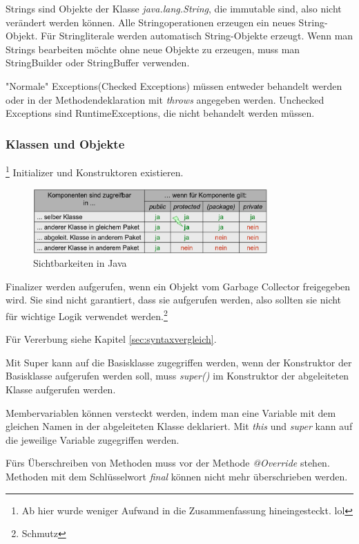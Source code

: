 \documentclass[12pt]{scrartcl}
\begin{document}
Strings sind Objekte der Klasse \emph{java.lang.String}, die immutable sind, also nicht verändert werden können.
Alle Stringoperationen erzeugen ein neues String-Objekt. Für Stringliterale werden automatisch
String-Objekte erzeugt.
Wenn man Strings bearbeiten möchte ohne neue Objekte zu erzeugen, muss man StringBuilder oder StringBuffer verwenden.

"Normale" Exceptions(Checked Exceptions) müssen entweder behandelt werden oder in der
Methodendeklaration mit \emph{throws} angegeben werden. Unchecked Exceptions sind RuntimeExceptions, die nicht behandelt werden müssen.
\pagebreak

\subsubsection{Klassen und Objekte}
\footnote{Ab hier wurde weniger Aufwand in die Zusammenfassung hineingesteckt. lol}
Initializer und Konstruktoren existieren.

\begin{figure}[H]
	\centering
	\includegraphics[width=0.8\textwidth]{images/java_2.png}
	\caption{Sichtbarkeiten in Java}
\end{figure}

Finalizer werden aufgerufen, wenn ein Objekt vom Garbage Collector freigegeben wird.
Sie sind nicht garantiert, dass sie aufgerufen werden, also sollten sie nicht für wichtige
Logik verwendet werden.\footnote{Schmutz}

Für Vererbung siehe Kapitel \ref{sec:syntaxvergleich}.

Mit Super kann auf die Basisklasse zugegriffen werden, wenn der Konstruktor der Basisklasse
aufgerufen werden soll, muss \emph{super()} im Konstruktor der abgeleiteten Klasse aufgerufen
werden.

Membervariablen können versteckt werden, indem man eine Variable mit dem gleichen Namen
in der abgeleiteten Klasse deklariert. Mit \emph{this} und \emph{super} kann auf die
jeweilige Variable zugegriffen werden.

Fürs Überschreiben von Methoden muss vor der Methode \emph{@Override} stehen.
Methoden mit dem Schlüsselwort \emph{final} können nicht mehr überschrieben werden.
\end{document}
